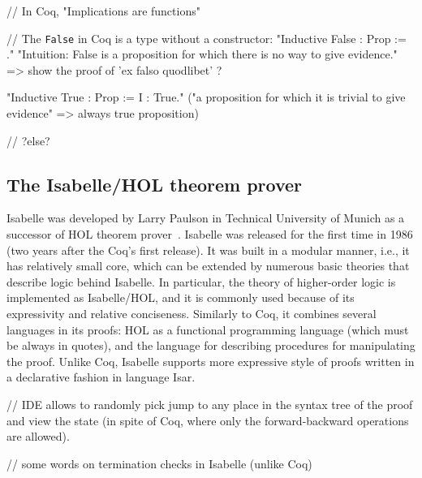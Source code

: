 \documentclass[article]{aaltoseries}
\begin{document}
// In Coq, "Implications are functions"

// The \texttt{False} in Coq is a type without a constructor:
	"Inductive False : Prop := ." 
"Intuition: False is a proposition for which there is no way to give evidence."
=> show the proof of 'ex falso quodlibet' ?

"Inductive True : Prop := I : True." ("a proposition for which it is trivial to give evidence" => always true proposition)



// ?else?




\subsection{The Isabelle/HOL theorem prover}
\label{sec:prover_isabelle}

Isabelle was developed by Larry Paulson in Technical University of Munich as a successor of HOL theorem prover~\cite{tool_HOL}. Isabelle was released for the first time in 1986 (two years after the Coq's first release). It was built in a modular manner, i.e., it has relatively small core, which can be extended by numerous basic theories that describe logic behind Isabelle. In particular, the theory of higher-order logic is implemented as Isabelle/HOL, and it is commonly used because of its expressivity and relative conciseness. Similarly to Coq, it combines several languages in its proofs: HOL as a functional programming language (which must be always in quotes), and the language for describing procedures for manipulating the proof. Unlike Coq, Isabelle supports more expressive style of proofs written in a declarative fashion in language Isar.

// IDE allows to randomly pick jump to any place in the syntax tree of the proof and view the state (in spite of Coq, where only the forward-backward operations are allowed).


// some words on termination checks in Isabelle (unlike Coq)
\end{document}
